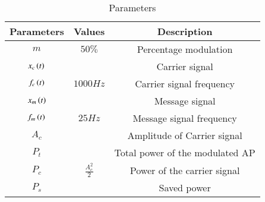 \begin{table}[htbp]
    \centering
    \begin{tabular}{|c|c|c|} \hline
      \textbf{Parameters} & \textbf{Values} & \textbf{Description} \\ \hline
      $m$ & $50\%$ & Percentage modulation \\ \hline
      $x_c\left(t\right)$ & & Carrier signal \\ \hline
      $f_c\left(t\right)$ & $1000 Hz$ & Carrier signal frequency \\ \hline
      $x_m\left(t\right)$ & & Message signal \\ \hline
      $f_m\left(t\right)$ & $25 Hz$ & Message signal frequency \\ \hline
      $A_c$ & & Amplitude of Carrier signal \\ \hline
      $P_t$ & & Total power of the modulated AP \\ \hline
      $P_c$ & $\frac{A_c^2}{2}$ & Power of the carrier signal \\ \hline
      $P_s$ & & Saved power \\ \hline
    \end{tabular}
    \vspace{3pt}
    \caption{Parameters}
    \label{tab:gate-21-ec-22}
\end{table}
